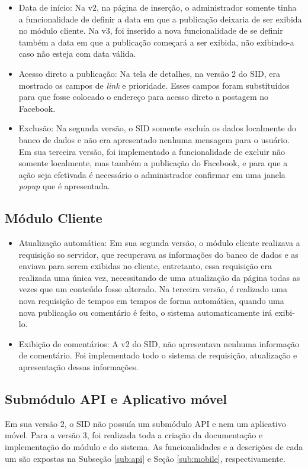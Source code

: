 \begin{itemize}
        \item Data de início: Na v2, na página de inserção, o administrador somente tinha a funcionalidade de definir a data em que a publicação deixaria de ser exibida no módulo cliente. Na v3, foi inserido a nova funcionalidade de se definir também a data em que a publicação começará a ser exibida, não exibindo-a caso não esteja com data válida.
        
        \item Acesso direto a publicação: Na tela de detalhes, na versão 2 do SID, era mostrado os campos de \textit{link} e prioridade. Esses campos foram substituídos para que fosse colocado o endereço para acesso direto a postagem no Facebook.
        
        \item Exclusão: Na segunda versão, o SID somente excluía os dados localmente do banco de dados e não era apresentado nenhuma mensagem para o usuário. Em sua terceira versão, foi implementado a funcionalidade de excluir não somente localmente, mas também a publicação do Facebook, e para que a ação seja efetivada é necessário o administrador confirmar em uma janela \textit{popup} que é apresentada. 
    \end{itemize}
\subsection{Módulo Cliente}
    \begin{itemize}
        \item Atualização automática: Em sua segunda versão, o módulo cliente realizava a requisição so servidor, que recuperava as informações do banco de dados e as enviava para serem exibidas no cliente, entretanto, essa requisição era realizada uma única vez, necessitando de uma atualização da página todas as vezes que um conteúdo fosse alterado. Na terceira versão, é realizado uma nova requisição de tempos em tempos de forma automática, quando uma nova publicação ou comentário é feito, o sistema automaticamente irá exibi-lo.
        
        \item Exibição de comentários: A v2 do SID, não apresentava nenhuma informação de comentário. Foi implementado todo o sistema de requisição, atualização e apresentação dessas informações.
    \end{itemize}
\subsection{Submódulo API e Aplicativo móvel}
Em sua versão 2, o SID não possuía um submódulo API e nem um aplicativo móvel. Para a versão 3, foi realizada toda a criação da documentação e implementação do módulo e do sistema. As funcionalidades e a descrições de cada um são expostas na Subseção \ref{sub:api} e Seção \ref{sub:mobile}, respectivamente.

